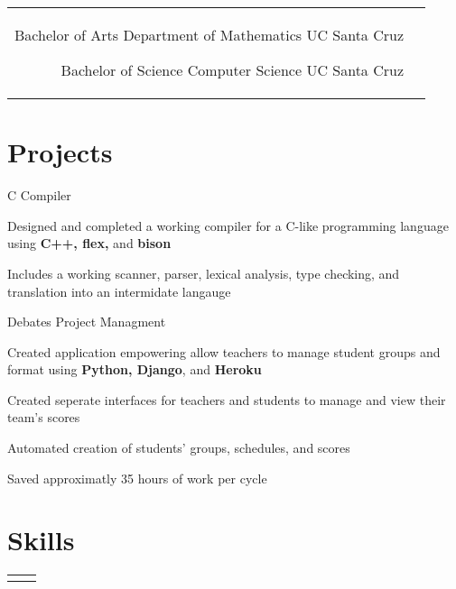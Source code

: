 \documentclass[10pt]{article}
\begin{document}
\begin{paracol}{2}
\begin{supertabular}{rl}
	{Bachelor of Arts}
	{}
    {Department of Mathematics}
	{UC Santa Cruz}

    {Bachelor of Science}
    {}
    {Computer Science}
    {UC Santa Cruz}

\end{supertabular}


\switchcolumn

\section{Projects}

{}{}
{C Compiler}{}
{
  \item Designed and completed a working compiler for a C-like programming language
    using \textbf{C++, flex,} and \textbf{bison}
  \item Includes a working scanner, parser, lexical analysis, type checking,
    and translation in\-to an intermidate langauge
}

{}{}
{Debates Project Managment}{}
{
  \item Created application empowering allow teachers to manage
    student groups and format using \textbf{Python, Django},
    and \textbf{Heroku}
  \item Created seperate interfaces for teachers and students to
    manage and view their team's scores
  \item Automated creation of students' groups, sche\-dules, and scores
  \item Saved approximatly 35 hours of work per cycle
}


\section{Skills}
\begin{supertabular}{rl}



\end{supertabular}

\end{paracol}
\end{document}
